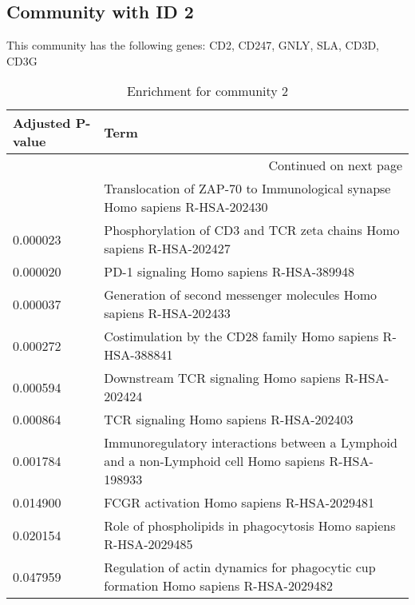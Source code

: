 \subsection*{Community with ID 2}
This community has the following genes: CD2, CD247, GNLY, SLA, CD3D, CD3G
\\
\begin{longtable}{p{2.4cm}p{14.5cm}}
\caption{Enrichment for community 2}\\
\toprule
Adjusted \newline P-value &                                                                                                Term \\
\midrule
\endhead
\midrule
\multicolumn{2}{r}{{Continued on next page}} \\
\midrule
\endfoot

\bottomrule
\endlastfoot
                 0.000030 &                          Translocation of ZAP-70 to Immunological synapse Homo sapiens R-HSA-202430 \\
                 0.000023 &                                Phosphorylation of CD3 and TCR zeta chains Homo sapiens R-HSA-202427 \\
                 0.000020 &                                                            PD-1 signaling Homo sapiens R-HSA-389948 \\
                 0.000037 &                                  Generation of second messenger molecules Homo sapiens R-HSA-202433 \\
                 0.000272 &                                          Costimulation by the CD28 family Homo sapiens R-HSA-388841 \\
                 0.000594 &                                                  Downstream TCR signaling Homo sapiens R-HSA-202424 \\
                 0.000864 &                                                             TCR signaling Homo sapiens R-HSA-202403 \\
                 0.001784 &  Immunoregulatory interactions between a Lymphoid and a non-Lymphoid cell Homo sapiens R-HSA-198933 \\
                 0.014900 &                                                          FCGR activation Homo sapiens R-HSA-2029481 \\
                 0.020154 &                                    Role of phospholipids in phagocytosis Homo sapiens R-HSA-2029485 \\
                 0.047959 &                Regulation of actin dynamics for phagocytic cup formation Homo sapiens R-HSA-2029482 \\
\end{longtable}


